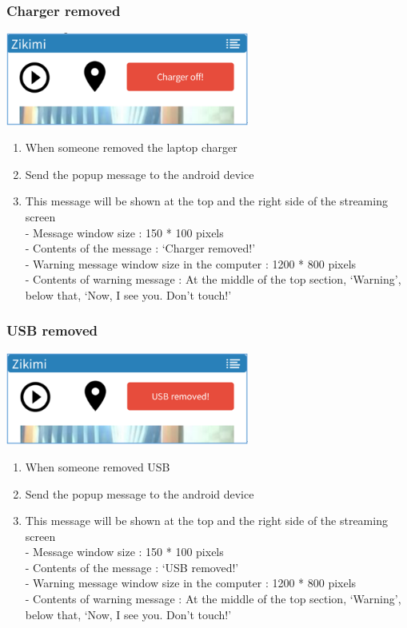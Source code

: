 \documentclass[12pt]{article}
\begin{document}
\subsubsection{Charger removed}
\begin{center} 
\includegraphics[width=80mm,scale=1.2]{charger}
\end{center}
\begin{enumerate}
\item When someone removed the laptop charger
\item Send the popup message to the android device
\item This message will be shown at the top and the right side of the streaming screen\\
 - Message window size : 150 * 100 pixels\\
 - Contents of the message : ‘Charger removed!’\\
 - Warning message window size in the computer : 1200 * 800 pixels\\
- Contents of warning message : At the middle of the top section, ‘Warning’, below that, ‘Now, I see you. Don’t touch!’\\
\end{enumerate}

\subsubsection{USB removed}
\begin{center} 
\includegraphics[width=80mm,scale=1.2]{usbremoved}
\end{center}
\begin{enumerate}
\item When someone removed USB
\item Send the popup message to the android device
\item This message will be shown at the top and the right side of the streaming screen\\
 - Message window size : 150 * 100 pixels\\
 - Contents of the message : ‘USB removed!’\\
- Warning message window size in the computer : 1200 * 800 pixels\\
- Contents of warning message : At the middle of the top section, ‘Warning’, below that, ‘Now, I see you. Don’t touch!’\\
\end{enumerate}
\end{document}

